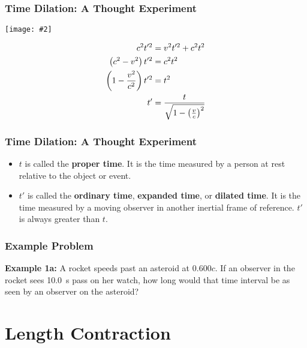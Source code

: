 \documentclass[12pt,compress,aspectratio=169]{beamer}
\newcommand{\pic}[2]{\texttt{[image: \#2]}}
\newcommand{\bigsqrt}{\ensuremath\sqrt{1-\left(\frac{v}{c}\right)^2}}
\newcommand{\eq}[2]{\vspace{#1}{\Large\begin{displaymath}#2\end{displaymath}}}
\begin{document}
\begin{frame}
  \frametitle{Time Dilation: A Thought Experiment}
  \begin{center}
    \pic{.7}{graphics/dilation.png}
  \end{center}
  \begin{align*}
    c^2t'^2 &=v^2t'^2 + c^2t^2\\
    \left(c^2-v^2\right)t'^2 &=c^2t^2\\
    \left(1-\frac{v^2}{c^2}\right)t'^2 &=t^2\\
    t' &=\frac{t}{\bigsqrt}
  \end{align*}
\end{frame}


\begin{frame}
  \frametitle{Time Dilation: A Thought Experiment}
  
  \eq{-.2in}{
    \boxed{t' =\frac{t}{\bigsqrt}}
  }
  \begin{itemize}
  \item $t$ is called the \textbf{proper time}. It is the time measured
    by a person at rest relative to the object or event.
  \item $t'$ is called the \textbf{ordinary time}, \textbf{expanded time}, or
    \textbf{dilated time}. It is the time measured by a moving observer in
    another inertial frame of reference.
    $t'$ is always greater than $t$.
  \end{itemize}
\end{frame}

\begin{frame}
  \frametitle{Example Problem}
  \textbf{Example 1a:} A rocket speeds past an asteroid at $0.600c$. If an
  observer in the rocket sees \SI{10.0}{s} pass on her watch, how long would
  that time interval be as seen by an observer on the asteroid?


\end{frame}


\section{Length Contraction}
\end{document}
